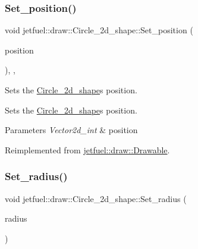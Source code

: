 \subsubsection{\texorpdfstring{Set\+\_\+position()}{Set\_position()}}
{\footnotesize\ttfamily void jetfuel\+::draw\+::\+Circle\+\_\+2d\+\_\+shape\+::\+Set\+\_\+position (\begin{DoxyParamCaption}\item[{const \hyperlink{classjetfuel_1_1draw_1_1Vector2d}{Vector2d\+\_\+int}}]{position }\end{DoxyParamCaption})\hspace{0.3cm}{\ttfamily [inline]}, {\ttfamily [override]}, {\ttfamily [virtual]}}



Sets the \hyperlink{classjetfuel_1_1draw_1_1Circle__2d__shape}{Circle\+\_\+2d\+\_\+shape}\textquotesingle{}s position. 

Sets the \hyperlink{classjetfuel_1_1draw_1_1Circle__2d__shape}{Circle\+\_\+2d\+\_\+shape}\textquotesingle{}s position.


\begin{DoxyParams}{Parameters}
{\em Vector2d\+\_\+int} & position \\
\hline
\end{DoxyParams}


Reimplemented from \hyperlink{classjetfuel_1_1draw_1_1Drawable_afdd035afe40c706459a6c9df813bcce6}{jetfuel\+::draw\+::\+Drawable}.

\mbox{\label{classjetfuel_1_1draw_1_1Circle__2d__shape_a100c20cab54eaaafca78147854b0a3c3}} 
\subsubsection{\texorpdfstring{Set\+\_\+radius()}{Set\_radius()}}
{\footnotesize\ttfamily void jetfuel\+::draw\+::\+Circle\+\_\+2d\+\_\+shape\+::\+Set\+\_\+radius (\begin{DoxyParamCaption}\item[{const int}]{radius }\end{DoxyParamCaption})\hspace{0.3cm}{\ttfamily [inline]}}



